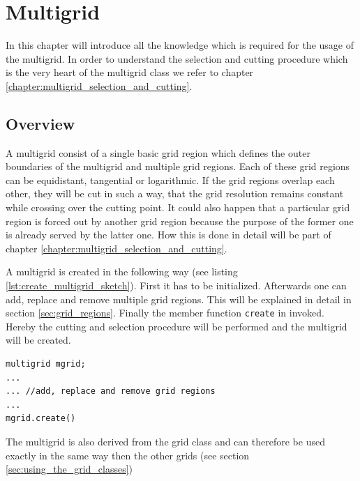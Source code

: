 \chapter{Multigrid} \label{chapter:multigrid_usage}
In this chapter will introduce all the knowledge which is required for the usage of the multigrid. In order to understand the selection and cutting procedure which is the very heart of the multigrid class we refer to chapter \ref{chapter:multigrid_selection_and_cutting}.

\section{Overview}
A multigrid consist of a single basic grid region which defines the outer boundaries of the multigrid and multiple grid regions. Each of these grid regions can be equidistant, tangential or logarithmic. If the grid regions overlap each other, they will be cut in such a way, that the grid resolution remains constant while crossing over the cutting point. It could also happen that a particular grid region is forced out by another grid region because the purpose of the former one is already served by the latter one. How this is done in detail will be part of chapter \ref{chapter:multigrid_selection_and_cutting}.

A multigrid is created in the following way (see listing \ref{lst:create_multigrid_sketch}). First it has to be initialized. Afterwards one can add, replace and remove multiple grid regions. This will be explained in detail in section \ref{sec:grid_regions}. Finally the member function \texttt{create} in invoked. Hereby the cutting and selection procedure will be performed and the multigrid will be created. 
\begin{lstlisting}[caption={Creating a multigrid},	label={lst:create_multigrid_sketch}]
multigrid mgrid;
... 
... //add, replace and remove grid regions
...
mgrid.create()
\end{lstlisting}
The multigrid is also derived from the grid class and can therefore be used exactly in the same way then the other grids (see section \ref{sec:using_the_grid_classes})

